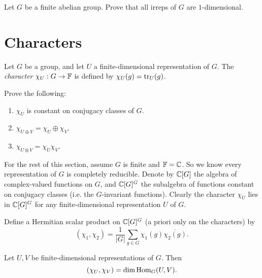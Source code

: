 \begin{exercise}
  Let $G$ be a finite abelian group.
  Prove that all irreps of $G$ are
  $1$-dimensional.
\end{exercise}

\section{Characters}

\begin{definition}
  Let $G$ be a group, and let $U$ a
  finite-dimensional representation of $G$.
  The \emph{character} $\chi_U : G \to \mathbb{F}$
  is defined by $\chi_U(g) = \operatorname{tr}_U(g)$.
\end{definition}

\begin{exercise}
  Prove the following:
  \begin{enumerate}
    \item $\chi_U$ is constant on
      conjugacy classes of $G$.
    \item $\chi_{U \oplus V} = \chi_U \oplus \chi_V$.
    \item $\chi_{U \otimes V} = \chi_U \chi_V$.
  \end{enumerate}
\end{exercise}

\begin{remark}
  For the rest of this section,
  assume $G$ is finite and $\mathbb{F} = \mathbb{C}$.
  So we know every representation
  of $G$ is completely reducible.
  Denote by $\mathbb{C}[G]$ the algebra of
  complex-valued functions on $G$, and
  $\mathbb{C}[G]^G$ the subalgebra of
  functions constant on conjugacy
  classes (i.e. the $G$-invariant functions).
  Clearly the character $\chi_U$ lies
  in $\mathbb{C}[G]^G$ for any finite-dimensional
  representation $U$ of $G$.
\end{remark}

\begin{definition}
  Define a Hermitian scalar product
  on $\mathbb{C}[G]^G$ (a priori only on the
  characters) by
  \[
    (\chi_1, \chi_2)
    = \frac{1}{|G|} \sum_{g \in G}
    \chi_1(g) \overline{\chi_2(g)}.
  \]
\end{definition}

\begin{prop}
  Let $U, V$ be finite-dimensional
  representations of $G$. Then
  \[
    (\chi_U, \chi_V) = \dim \operatorname{Hom}_G(U, V).
  \]
\end{prop}

